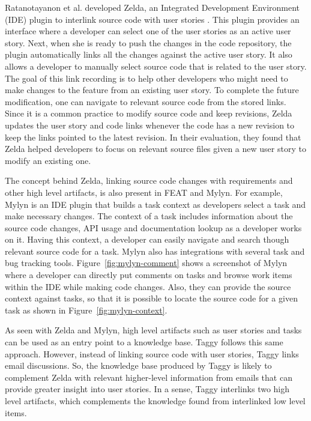 Ratanotayanon et al. developed Zelda, an Integrated Development Environment (IDE) plugin to interlink source code with user stories \cite{supporting_program}. This plugin provides an interface where a developer can select one of the user stories as an active user story. Next, when she is ready to push the changes in the code repository, the plugin automatically links all the changes against the active user story. It also allows a developer to manually select source code that is related to the user story. The goal of this link recording is to help other developers who might need to make changes to the feature from an existing user story. To complete the future modification, one can navigate to relevant source code from the stored links. Since it is a common practice to modify source code and keep revisions, Zelda updates the user story and code links whenever the code has a new revision to keep the links pointed to the latest revision. In their evaluation, they found that Zelda helped developers to focus on relevant source files given a new user story to modify an existing one.

The concept behind Zelda, linking source code changes with requirements and other high level artifacts, is also present in FEAT\cite{feat} and Mylyn\cite{mylyn}. For example, Mylyn is an IDE plugin that builds a task context as developers select a task and make necessary changes. The context of a task includes information about the source code changes, API usage and documentation lookup as a developer works on it. Having this context, a developer can easily navigate and search though relevant source code for a task. Mylyn also has integrations with several task and bug tracking tools. Figure~\ref{fig:mylyn-comment} shows a screenshot of Mylyn where a developer can directly put comments on tasks and browse work items within the IDE while making code changes. Also, they can provide the source context against tasks, so that it is possible to locate the source code for a given task as shown in Figure~\ref{fig:mylyn-context}.

As seen with Zelda and Mylyn, high level artifacts such as user stories and tasks can be used as an entry point to a knowledge base. Taggy follows this same approach. However, instead of linking source code with user stories, Taggy links email discussions. So, the knowledge base produced by Taggy is likely to complement Zelda with relevant higher-level information from emails that can provide greater insight into user stories. In a sense, Taggy interlinks two high level artifacts, which complements the knowledge found from interlinked low level items.

